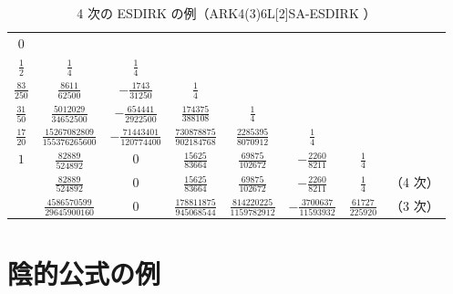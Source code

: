 \begin{table}[bp]
    \caption{4 次の ESDIRK の例（ARK4(3)6L[2]SA-ESDIRK \cite{Kennedy2003}）}
    \label{table:ode_runge-kutta_butcher-array-ark436l2sa-esdirk}
    \centering
    \begin{tabular}{c|ccccccc}
        $0$              &                                    &                               &                               &                                &                             &                        &       \\
        $\frac{1}{2}$    & $\frac{1}{4}$                      & $\frac{1}{4}$                 &                               &                                &                             &                        &       \\
        $\frac{83}{250}$ & $\frac{8611}{62500}$               & $-\frac{1743}{31250}$         & $\frac{1}{4}$                 &                                &                             &                        &       \\
        $\frac{31}{50}$  & $\frac{5012029}{34652500}$         & $-\frac{654441}{2922500}$     & $\frac{174375}{388108}$       & $\frac{1}{4}$                  &                             &                        &       \\
        $\frac{17}{20}$  & $\frac{15267082809}{155376265600}$ & $-\frac{71443401}{120774400}$ & $\frac{730878875}{902184768}$ & $\frac{2285395}{8070912}$      & $\frac{1}{4}$               &                        &       \\
        $1$              & $\frac{82889}{524892}$             & $0$                           & $\frac{15625}{83664}$         & $\frac{69875}{102672}$         & $-\frac{2260}{8211}$        & $\frac{1}{4}$          &       \\
        \hline
                         & $\frac{82889}{524892}$             & $0$                           & $\frac{15625}{83664}$         & $\frac{69875}{102672}$         & $-\frac{2260}{8211}$        & $\frac{1}{4}$          & （4 次） \\
                         & $\frac{4586570599}{29645900160}$   & $0$                           & $\frac{178811875}{945068544}$ & $\frac{814220225}{1159782912}$ & $-\frac{3700637}{11593932}$ & $\frac{61727}{225920}$ & （3 次）
    \end{tabular}
\end{table}

\section{陰的公式の例}

